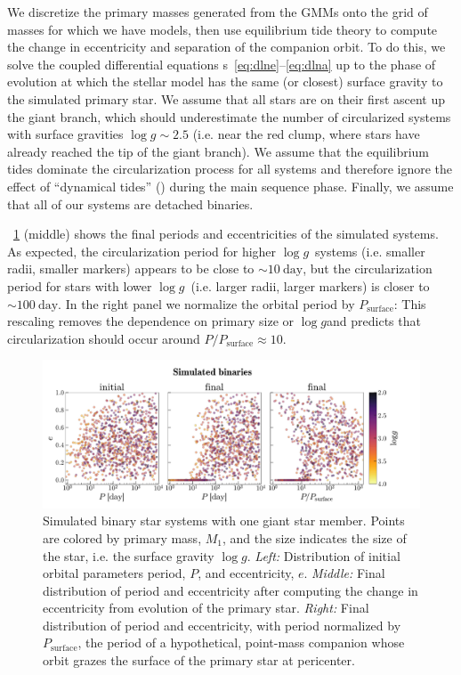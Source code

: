 \documentclass[modern, letterpaper]{aastex62}
\newcommand{\logg}{\ensuremath{\log g}}
\newcommand{\Psurf}{\ensuremath{P_\textrm{surface}}}
\begin{document}
We discretize the primary masses generated from the GMMs onto the grid of masses
for which we have  models, then use equilibrium tide theory to
compute the change in eccentricity and separation of the companion orbit.
To do this, we solve the coupled differential equations \eqname
s~\ref{eq:dlne}--\ref{eq:dlna} up to the phase of evolution at which the stellar
model has the same (or closest) surface gravity to the simulated primary star.
We assume that all stars are on their first ascent up the giant branch, which
should underestimate the number of circularized systems with surface gravities
$\logg \sim 2.5$ (i.e. near the red clump, where stars have already reached the
tip of the giant branch).
We assume that the equilibrium tides dominate the circularization process for
all systems and therefore ignore the effect of ``dynamical tides''
(\citealt{who}) during the main sequence phase.
Finally, we assume that all of our systems are detached binaries.

\figurename~\ref{fig:simulated} (middle) shows the final periods and
eccentricities of the simulated systems.
As expected, the circularization period for higher \logg\ systems (i.e. smaller
radii, smaller markers) appears to be close to $\sim 10~\textrm{day}$, but the
circularization period for stars with lower \logg\ (i.e. larger radii, larger
markers) is closer to $\sim 100~\textrm{day}$.
In the right panel we normalize the orbital period by \Psurf:
This rescaling removes the dependence on primary size or \logg and predicts that
circularization should occur around $P / \Psurf \approx 10$.

\begin{figure}[htbp]
\begin{center}
\includegraphics[trim={0 0 1cm 0}, clip, width=\linewidth]{simulated}
\end{center}
\caption{%
Simulated binary star systems with one giant star member.
Points are colored by primary mass, $M_1$, and the size indicates the size of
the star, i.e. the surface gravity $\log g$.
\textit{Left:} Distribution of initial orbital parameters period, $P$, and
eccentricity, $e$.
\textit{Middle:} Final distribution of period and eccentricity after computing
the change in eccentricity from evolution of the primary star.
\textit{Right:} Final distribution of period and eccentricity, with period
normalized by \Psurf, the period of a hypothetical, point-mass
companion whose orbit grazes the surface of the primary star at pericenter.
\label{fig:simulated}
}
\end{figure}
\end{document}
